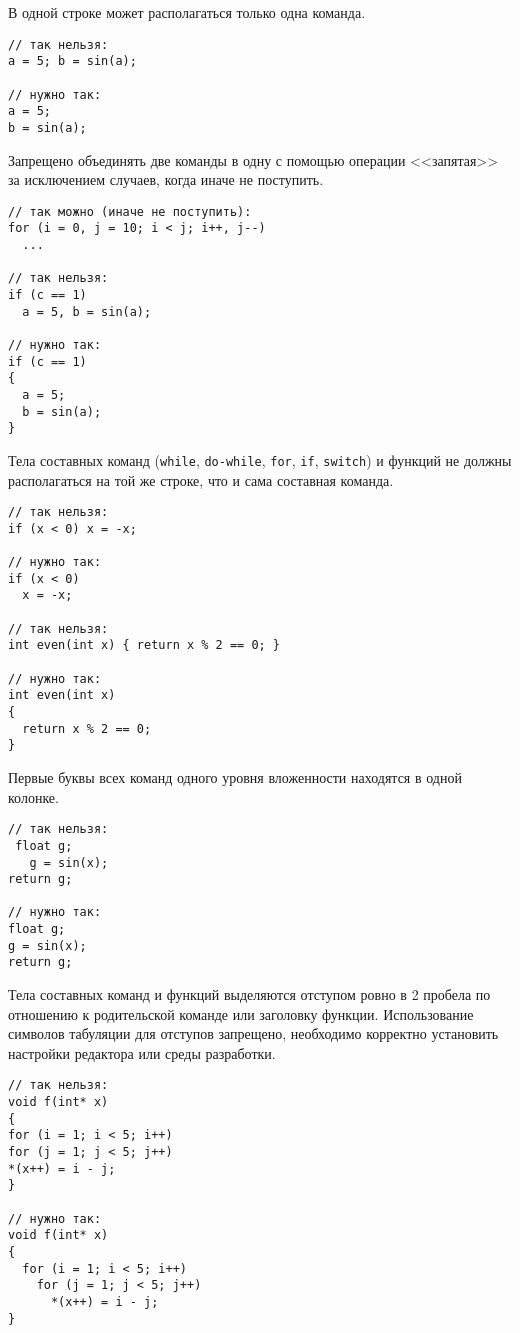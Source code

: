 \zzstyleitem
В одной строке может располагаться только одна команда.

\begin{verbatim}
// так нельзя:
a = 5; b = sin(a);

// нужно так:
a = 5;
b = sin(a);
\end{verbatim}

\zzstyleitem

Запрещено объединять две команды в одну с помощью операции <<запятая>>
за исключением случаев, когда иначе не поступить.

\begin{verbatim}
// так можно (иначе не поступить):
for (i = 0, j = 10; i < j; i++, j--)
  ...

// так нельзя:
if (c == 1)
  a = 5, b = sin(a);

// нужно так:
if (c == 1)
{
  a = 5;
  b = sin(a);
}
\end{verbatim}

\zzstyleitem

Тела составных команд (\texttt{while}, \texttt{do-while}, \texttt{for},
\texttt{if}, \texttt{switch}) и функций не должны располагаться на той
же строке, что и сама составная команда.

\begin{verbatim}
// так нельзя:
if (x < 0) x = -x;

// нужно так:
if (x < 0)
  x = -x;

// так нельзя:
int even(int x) { return x % 2 == 0; }

// нужно так:
int even(int x)
{
  return x % 2 == 0;
}
\end{verbatim}

\zzstyleitem

Первые буквы всех команд одного уровня вложенности находятся в одной
колонке.

\begin{verbatim}
// так нельзя:
 float g;
   g = sin(x);
return g;

// нужно так:
float g;
g = sin(x);
return g;
\end{verbatim}

\zzstyleitem

Тела составных команд и функций выделяются отступом ровно в 2 пробела по
отношению к родительской команде или заголовку функции. Использование
символов табуляции для отступов запрещено, необходимо корректно
установить настройки редактора или среды разработки.

\begin{verbatim}
// так нельзя:
void f(int* x)
{
for (i = 1; i < 5; i++)
for (j = 1; j < 5; j++)
*(x++) = i - j;
}

// нужно так:
void f(int* x)
{
  for (i = 1; i < 5; i++)
    for (j = 1; j < 5; j++)
      *(x++) = i - j;
}
\end{verbatim}

